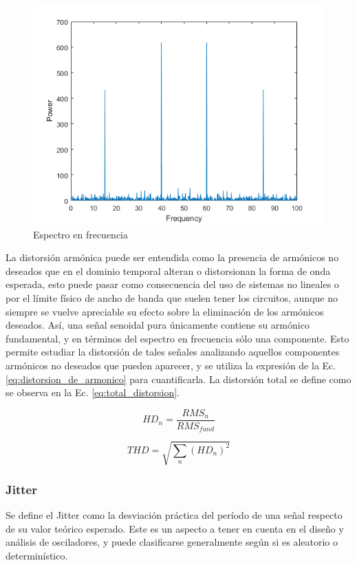 \begin{figure}[H]
    \centering
    \includegraphics[scale=0.4]{../EJ3/Recursos/BasicSpectralAnalysisExample_01.png} 
    \caption{Espectro en frecuencia}
\end{figure}

La distorsi\'on arm\'onica puede ser entendida como la presencia de arm\'onicos no deseados que en el dominio temporal alteran o distorsionan la forma
de onda esperada, esto puede pasar como consecuencia del uso de sistemas no lineales o por el l\'imite f\'isico de ancho de banda que suelen tener
los circuitos, aunque no siempre se vuelve apreciable su efecto sobre la eliminaci\'on de los arm\'onicos deseados.
As\'i, una se\~nal senoidal pura \'unicamente contiene su arm\'onico fundamental, y en t\'erminos del espectro en frecuencia s\'olo una componente. Esto permite
estudiar la distorsi\'on de tales se\~nales analizando aquellos componentes arm\'onicos no deseados que pueden aparecer, y se utiliza la expresi\'on de la Ec. \ref{eq:distorsion_de_armonico}
para cuantificarla. La distorsi\'on total se define como se observa en la Ec. \ref{eq:total_distorsion}.

\begin{equation}
    HD_n = \frac{RMS_n}{RMS_{fund}}
    \label{eq:distorsion_de_armonico}
\end{equation}

\begin{equation}
    THD = \sqrt{\sum_{n} (HD_n)^{2}}
    \label{eq:total_distorsion}
\end{equation}

\subsubsection{Jitter}
Se define el Jitter como la desviaci\'on pr\'actica del per\'iodo de una se\~nal respecto de su valor te\'orico esperado. Este es un aspecto
a tener en cuenta en el dise\~no y an\'alisis de osciladores, y puede clasificarse generalmente seg\'un si es aleatorio o determin\'istico.

